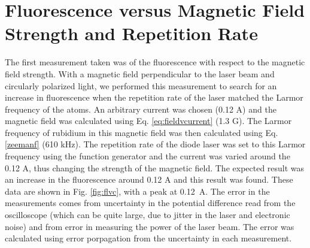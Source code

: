 %
%



\section{Fluorescence versus Magnetic Field Strength and Repetition Rate}

The first measurement taken was of the fluorescence with respect to the magnetic field strength. With a magnetic field perpendicular to the laser beam and circularly polarized light, we performed this measurement to search for an increase in fluorescence when the repetition rate of the laser matched the Larmor frequency of the atoms. An arbitrary current was chosen (0.12 A) and the magnetic field was calculated using Eq. \ref{eq:fieldvcurrent} (1.3 G). The Larmor frequency of rubidium in this magnetic field was then calculated using Eq. \ref{zeemanf} (610 kHz). The repetition rate of the diode laser was set to this Larmor frequency using the function generator and the current was varied around the 0.12 A, thus changing the strength of the magnetic field. The expected result was an increase in the fluorescence around 0.12 A and this result was found. These data are shown in Fig. \ref{fig:flvc}, with a peak at \SI{0.12}{ A}. The error in the measurements comes from uncertainty in the potential difference read from the oscilloscope (which can be quite large, due to jitter in the laser and electronic noise) and from error in measuring the power of the laser beam. The error was calculated using error porpagation from the uncertainty in each measurement.


